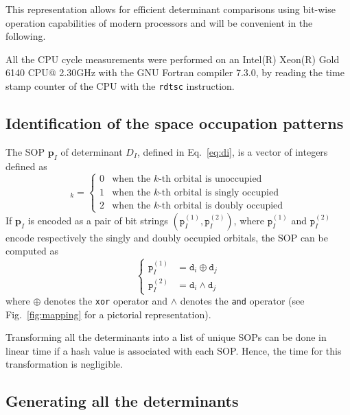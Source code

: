 \documentclass[aip,jcp,reprint,showkeys]{revtex4-1}
\newcommand{\md}{\mathtt{d}}
\newcommand{\mpp}{\mathtt{p}}
\newcommand{\mpv}{\mathbf{p}}
\newcommand{\sop}{SOP}
\newcommand{\cpu}{CPU}
\begin{document}
This representation allows for efficient determinant comparisons using bit-wise operation 
capabilities of modern processors\cite{Scemama_2013} and will be convenient in the following.

All the {\cpu} cycle measurements were performed on an Intel(R) Xeon(R)
Gold 6140 \cpu @ 2.30GHz with the GNU Fortran compiler 7.3.0, by reading
the time stamp counter of the {\cpu} with the \texttt{rdtsc} instruction.


\subsection{Identification of the space occupation patterns}

The {\sop} $\mpv_I$ of determinant $D_I$, 
defined in Eq.~\eqref{eq:di},
is a vector of integers defined as
\begin{equation}
  [\mpv_I]_k = 
  \begin{cases} 
    0 & \text{when the $k$-th orbital is unoccupied} \\
    1 & \text{when the $k$-th orbital is singly occupied} \\
    2 & \text{when the $k$-th orbital is doubly occupied}
  \end{cases} 
\end{equation}
If $\mpv_I$ is encoded as a pair of bit strings $(\mpp_I^{(1)}, \mpp_I^{(2)})$,
where $\mpp_I^{(1)}$ and $\mpp_I^{(2)}$ encode respectively the singly and
doubly occupied orbitals, the {\sop} can be computed as
\begin{equation}
\label{eq:sop}
\begin{cases}
  \mpp_I^{(1)} & = \md_i \oplus \md_j \\
  \mpp_I^{(2)} & = \md_i \wedge \md_j 
  \end{cases} 
\end{equation}
where $\oplus$ denotes the \texttt{xor} operator and $\wedge$ denotes the
\texttt{and} operator (see Fig.~\ref{fig:mapping} for a pictorial representation).

Transforming all the determinants into a list of unique {\sop s} can be done
in linear time if a hash value is associated with each {\sop}.\cite{Bitton_1983}
Hence, the time for this transformation is negligible.


\subsection{Generating all the determinants}
\end{document}
